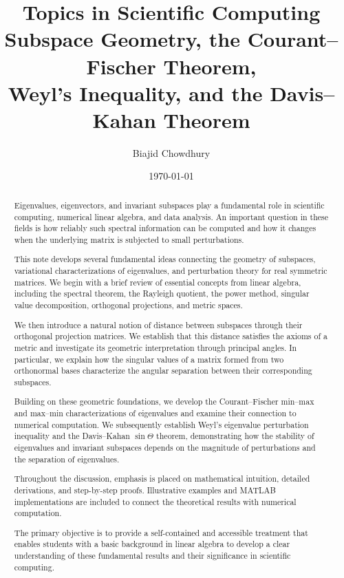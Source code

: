 \documentclass[14pt,letterpaper]{article}
\title{
    \textbf{Topics in Scientific Computing}\\[0.5em]
    \large
    Subspace Geometry, the Courant--Fischer Theorem,\\
    Weyl's Inequality, and the Davis--Kahan Theorem
}
\author{Biajid Chowdhury}
\date{\today}
\theoremstyle{plain}
\theoremstyle{definition}
\theoremstyle{remark}
\begin{document}
\maketitle


\begin{abstract}

Eigenvalues, eigenvectors, and invariant subspaces play a
fundamental role in scientific computing, numerical linear
algebra, and data analysis. An important question in these
fields is how reliably such spectral information can be
computed and how it changes when the underlying matrix
is subjected to small perturbations.

This note develops several fundamental ideas connecting
the geometry of subspaces, variational characterizations
of eigenvalues, and perturbation theory for real symmetric
matrices. We begin with a brief review of essential concepts
from linear algebra, including the spectral theorem,
the Rayleigh quotient, the power method, singular value
decomposition, orthogonal projections, and metric spaces.

We then introduce a natural notion of distance between
subspaces through their orthogonal projection matrices.
We establish that this distance satisfies the axioms of
a metric and investigate its geometric interpretation
through principal angles. In particular, we explain how
the singular values of a matrix formed from two orthonormal
bases characterize the angular separation between their
corresponding subspaces.

Building on these geometric foundations, we develop the
Courant--Fischer min--max and max--min characterizations
of eigenvalues and examine their connection to numerical
computation. We subsequently establish Weyl's eigenvalue
perturbation inequality and the Davis--Kahan
$\sin\Theta$ theorem, demonstrating how the stability of
eigenvalues and invariant subspaces depends on the
magnitude of perturbations and the separation of
eigenvalues.

Throughout the discussion, emphasis is placed on
mathematical intuition, detailed derivations, and
step-by-step proofs. Illustrative examples and MATLAB
implementations are included to connect the theoretical
results with numerical computation.

The primary objective is to provide a self-contained
and accessible treatment that enables students with
a basic background in linear algebra to develop a
clear understanding of these fundamental results and
their significance in scientific computing.

\end{abstract}
\end{document}
